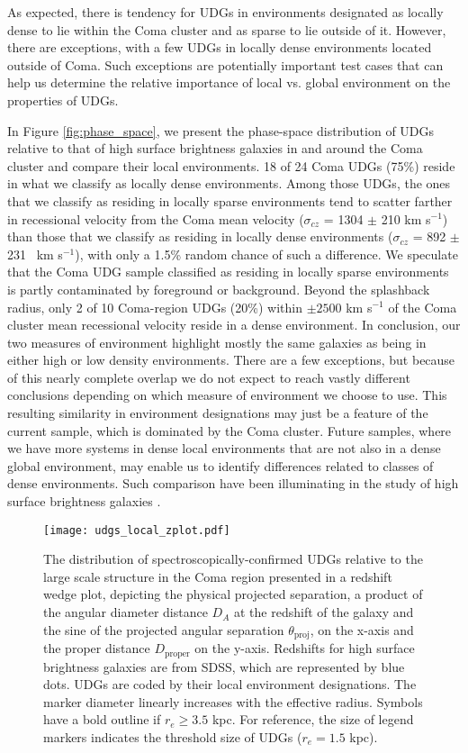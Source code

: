 \documentclass[twocolumn,tighten]{aastex63}
\begin{document}
As expected, there is tendency for UDGs in environments designated as locally dense to lie within the Coma cluster and as sparse to lie outside of it. However, there are exceptions, with a few UDGs in locally dense environments located outside of Coma. Such exceptions are potentially important test cases that can help us determine the relative importance of local vs. global environment on the properties of UDGs.  

In Figure \ref{fig:phase_space}, we present the phase-space distribution of UDGs relative to that of high surface brightness galaxies in and around the Coma cluster and compare their local environments. 18 of 24 Coma UDGs (75\%) reside in what we classify as locally dense environments. Among those UDGs, the ones that we classify as
residing in locally sparse environments tend to scatter farther in recessional 
velocity from the Coma mean velocity ($\sigma_{cz}$ = 1304 $\pm$ 210 km s$^{-1}$) than those that we
classify as residing in locally dense environments ($\sigma_{cz}$ = 892 $\pm$ 231 \, km s$^{-1}$), with only 
a 1.5\% random chance of such a difference. 
We speculate that the Coma UDG sample classified as residing in locally sparse environments is partly contaminated by foreground or background. 
Beyond the splashback radius, only 2 of 10 Coma-region UDGs (20\%) within $\pm 2500$ km s$^{-1}$ of the Coma cluster mean recessional velocity reside in a dense environment.
In conclusion, our two measures of environment highlight mostly the same galaxies as being in either high or low density environments. There are a few exceptions, but because of this nearly complete overlap we do not expect to reach vastly different conclusions depending on which measure of environment we choose to use. This resulting similarity in environment designations may just be a feature of the current sample, which is dominated by the Coma cluster. Future samples, where we have more systems in dense local environments that are not also in a dense global environment, may enable us to identify differences related to classes of dense environments. Such comparison have been illuminating in the study of high surface brightness galaxies \citep{Lewis2002,Gomez2003}.

\begin{figure}[t]
\texttt{[image: udgs\_local\_zplot.pdf]}
\caption{The distribution of spectroscopically-confirmed UDGs relative to the large scale structure in the Coma region presented in a redshift wedge plot, depicting the physical projected separation, a product of the angular diameter distance $D_A$ at the redshift of the galaxy and the sine of the projected angular separation $\theta_\mathrm{proj}$, on the x-axis and the proper distance $D_\mathrm{proper}$ on the y-axis. Redshifts for high surface brightness galaxies are from SDSS, which are represented by blue dots. UDGs are coded by their local environment designations. The marker diameter linearly increases with the effective radius. Symbols have a bold outline if $r_e \geq 3.5$ kpc. For reference, the size of legend markers indicates the threshold size of UDGs ($r_e = 1.5$ kpc).}
\label{fig:zplot}
\end{figure}
\end{document}
